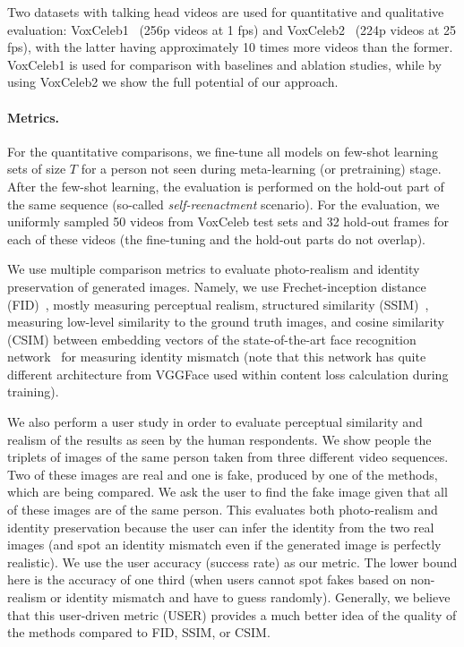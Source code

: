 \documentclass[10pt,twocolumn,letterpaper]{article}
\begin{document}
Two datasets with talking head videos are used for quantitative and qualitative evaluation: VoxCeleb1~\cite{Nagrani17} (256p videos at 1 fps) and VoxCeleb2~\cite{Chung18} (224p videos at 25 fps), with the latter having approximately 10 times more videos than the former. VoxCeleb1 is used for comparison with baselines and ablation studies, while by using VoxCeleb2 we show the full potential of our approach. 

\paragraph{Metrics.}

For the quantitative comparisons, we fine-tune all models on few-shot learning sets of size $T$ for a person not seen during meta-learning (or pretraining) stage. After the few-shot learning, the evaluation is performed on the hold-out part of the same sequence (so-called \textit{self-reenactment} scenario). For the evaluation, we uniformly sampled 50 videos from VoxCeleb test sets and 32 hold-out frames for each of these videos (the fine-tuning and the hold-out parts do not overlap).

We use multiple comparison metrics to evaluate photo-realism and identity preservation of generated images. Namely, we use Frechet-inception distance (FID)~\cite{Guyon17}, mostly measuring perceptual realism, structured similarity (SSIM)~\cite{Wang04}, measuring low-level similarity to the ground truth images, and cosine similarity (CSIM) between embedding vectors of the state-of-the-art face recognition network~\cite{Deng19} for measuring identity mismatch (note that this network has quite different architecture from VGGFace used within content loss calculation during training).

We also perform a user study in order to evaluate perceptual similarity and realism of the results as seen by the human respondents. We show people the triplets of images of the same person taken from three different video sequences. Two of these images are real and one is fake, produced by one of the methods, which are being compared. We ask the user to find the fake image given that all of these images are of the same person. This evaluates both photo-realism and identity preservation because the user can infer the identity from the two real images (and spot an identity mismatch even if the generated image is perfectly realistic). We use the user accuracy (success rate) as our metric. The lower bound here is the accuracy of one third (when users cannot spot fakes based on non-realism or identity mismatch and have to guess randomly). Generally, we believe that this user-driven metric (USER) provides a much better idea of the quality of the methods compared to FID, SSIM, or CSIM.
\end{document}
